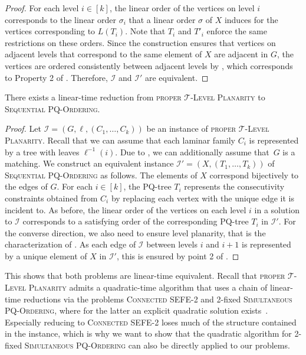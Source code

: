 \documentclass[runningheads]{llncs}
\newcommand{\pqprob}{\textsc{Sequential PQ-Or\-der\-ing}\xspace}
\newcommand{\simpq}{\textsc{Simultaneous PQ-Ordering}\xspace}
\newcommand{\tlp}{\textsc{proper $\mathcal T$-Level Planarity}\xspace}
\begin{document}
\begin{proof}
  For each level $i \in [k]$, the linear order of the vertices on level $i$ corresponds to the linear order $\sigma_i$ that a linear order $\sigma$ of $X$ induces for the vertices corresponding to $L(T_i)$.
  Note that $T_i$ and $T'_i$ enforce the same restrictions on these orders.
  Since the construction ensures that vertices on adjacent levels that correspond to the same element of $X$ are adjacent in $G$, the vertices are ordered consistently between adjacent levels by , which corresponds to Property 2 of .
  Therefore, $\mathcal I$ and $\mathcal I'$ are equivalent.
\end{proof}



\begin{lemma}
  \label{lem:tlp2pqprob}
  There exists a linear-time reduction from \tlp to \pqprob.
\end{lemma}
\begin{proof}
  Let $\mathcal I = (G, \ell, (C_1, \dots, C_k))$ be an instance of \tlp. 
  Recall that we can assume that each laminar family $C_i$ is represented by a tree with leaves $\ell^{-1}(i)$.
  Due to , we can additionally assume that~$G$ is a matching. We construct an equivalent instance $\mathcal I' = (X, (T_1, \dots, T_k))$ of \pqprob as follows.
  The elements of $X$ correspond bijectively to the edges of $G$.
  For each $i \in [k]$, the PQ-tree $T_i$ represents the consecutivity constraints obtained from $C_i$ by replacing each vertex with the unique edge it is incident to. As before, the linear order of the vertices on each level $i$ in a solution to $\mathcal I$ corresponds to a satisfying order of the corresponding PQ-tree $T_i$ in $\mathcal I'$.
  For the converse direction, we also need to ensure level planarity, that is the characterization of .
  As each edge of $\mathcal I$ between levels $i$ and $i+1$ is represented by a unique element of $X$ in $\mathcal I'$, this is ensured by point 2 of .
\end{proof}

This shows that both problems are linear-time equivalent.
Recall that \tlp admits a quadratic-time algorithm that uses a chain of linear-time reductions via the problems \textsc{Connected SEFE-2} and 2-fixed \simpq \cite{albfr-ibpcl-14,albfr-ibpcl-15}, where for the latter an explicit quadratic solution exists~\cite{br-spqoa-16}.
Especially reducing to \textsc{Connected SEFE-2} loses much of the structure contained in the instance, which is why we want to show that the quadratic algorithm for 2-fixed \simpq can also be directly applied to our problems.
\end{document}
